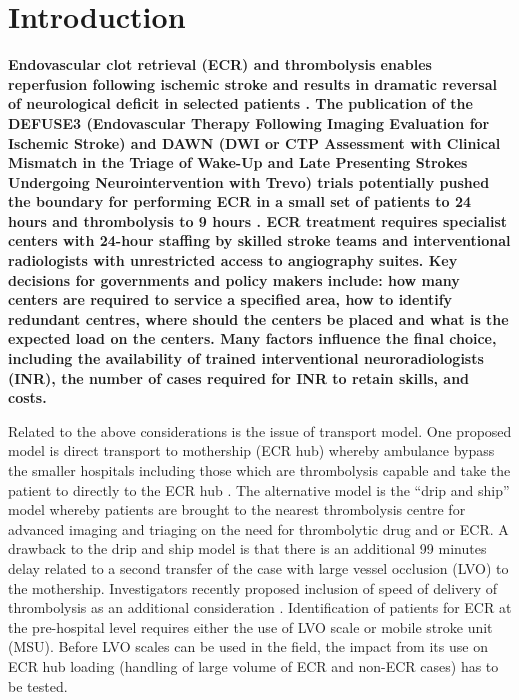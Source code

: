 \documentclass[utf8]{frontiersHLTH}
\begin{document}
\section{Introduction}\label{introduction}

{\bf
  Endovascular clot retrieval (ECR) and thrombolysis enables reperfusion
following ischemic stroke and results in dramatic reversal of
neurological deficit in selected patients
\cite{berkhemer2015randomized,goyal2016endovascular,goyal2015randomized,campbell2015endovascular,saver2015stent,ma2019thrombolysis}.
The publication of the DEFUSE3 (Endovascular Therapy Following Imaging
Evaluation for Ischemic Stroke) and DAWN (DWI or CTP Assessment with
Clinical Mismatch in the Triage of Wake-Up and Late Presenting Strokes
Undergoing Neurointervention with Trevo) trials potentially pushed the
boundary for performing ECR in a small set of patients to 24
hours\cite{nogueira2018thrombectomy,albers2018thrombectomy} and
thrombolysis to 9 hours \cite{ma2019thrombolysis}. ECR treatment requires
specialist centers with 24-hour staffing by skilled stroke teams and
interventional radiologists with unrestricted access to angiography
suites. Key decisions for governments and policy makers include: how
many centers are required to service a specified area, how to identify
redundant centres, where should
the centers be placed and what is the expected load on the
centers\cite{Phan_2017}. Many factors influence the final choice,
including the availability of trained interventional neuroradiologists
(INR), the number of cases required for INR to retain skills, and
costs.


Related to the above considerations is the issue of transport
model. One proposed model is direct transport to mothership (ECR hub)
whereby ambulance bypass the smaller hospitals including those which
are thrombolysis capable and take the patient to directly to the ECR
hub \cite{Milne_2017, 10.1001/jamaneurol.2018.2424}. The alternative
model is the ``drip and ship'' model whereby patients are brought to
the nearest thrombolysis centre for advanced imaging and triaging on
the need for thrombolytic drug and or ECR. A drawback to the drip and
ship model is that there is an additional 99 minutes delay related to
a second transfer of the case with large vessel occlusion (LVO) to the
mothership\cite{froehler2017interhospital}. Investigators recently
proposed inclusion of speed of delivery of thrombolysis as an additional
consideration \cite{10.1001/jamaneurol.2018.2424}. Identification of patients
for ECR at the pre-hospital level requires either the use of LVO scale
or mobile stroke unit (MSU). Before LVO scales can be used in the
field, the impact from its use on ECR hub loading (handling of large
volume of ECR and non-ECR cases) has to be tested.

}
\end{document}
